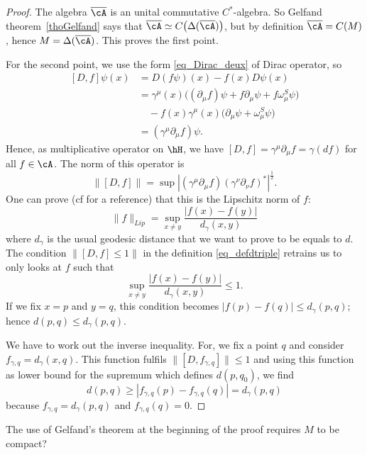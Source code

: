 \begin{proof}
	The algebra $\overline{ \cA }$ is an unital commutative $C^*$-algebra. So Gelfand theorem~\ref{thoGelfand} says that $\overline{ \cA }\simeq C\big( \Delta(\overline{ \cA }) \big)$, but by definition $\overline{\cA}=C(M)$, hence $M=\Delta(\overline{ \cA })$. This proves the first point.

	For the second point, we use the form \eqref{eq_Dirac_deux} of Dirac operator, so
	\begin{equation}
		\begin{split}
			[D,f]\psi(x)&=D(f\psi)(x)-f(x)D\psi(x)\\
			&=\gamma^{\mu}(x)\big( (\partial_{\mu}f)\psi+f\partial_{\mu}\psi+f\omega_{\mu}^S\psi \big)\\
			&\quad -f(x)\gamma^{\mu}(x)\big( \partial_{\mu}\psi+\omega_{\mu}^S\psi \big)\\
			&=(\gamma^{\mu}\partial_{\mu}f)\psi.
		\end{split}
	\end{equation}
	Hence, as multiplicative operator on $\hH$, we have $[D,f]=\gamma^{\mu}\partial_{\mu}f=\gamma(df)$ for all $f\in\cA$. The norm of this operator is
	\[
		\| [D,f] \|=\sup | (\gamma^{\mu}\partial_{\mu}f)(\gamma^{\nu}\partial_{\nu}f)^* |^{\frac{ 1 }{2}}.
	\]
	One can prove (cf \cite{Landi} for a reference) that this is the Lipschitz norm of $f$:
	\[
		\| f \|_{Lip}=\sup_{x\neq y}\frac{ | f(x)-f(y) | }{ d_{\gamma}(x,y) }
	\]
	where $d_{\gamma}$ is the usual geodesic distance that we want to prove to be equals to $d$. The condition $\| [D,f]\leq 1 \|$ in the definition  \eqref{eq_defdtriple} retrains us to only looks at $f$ such that
	\[
		\sup_{x\neq y}\frac{ | f(x)-f(y) | }{ d_{\gamma}(x,y) }\leq 1.
	\]
	If we fix $x=p$ and $y=q$, this condition becomes $| f(p)-f(q) |\leq d_{\gamma}(p,q)$; hence $d(p,q)\leq d_{\gamma}(p,q)$.

	We have to work out the inverse inequality. For, we fix a point $q$ and consider $f_{\gamma,q}=d_{\gamma}(x,q)$. This function fulfils $\| [D,f_{\gamma,q}] \| \leq 1$ and using this function as lower bound for the supremum which defines $d(p,q_0)$, we find
	\[
		d(p,q)\geq | f_{\gamma,q}(p)-f_{\gamma,q}(q) |=d_{\gamma}(p,q)
	\]
	because $f_{\gamma,q}=d_{\gamma}(p,q)$ and $f_{\gamma,q}(q)=0$.

\end{proof}

\begin{probleme}
	The use of Gelfand's theorem at the beginning of the proof requires $M$ to be compact?
\end{probleme}

